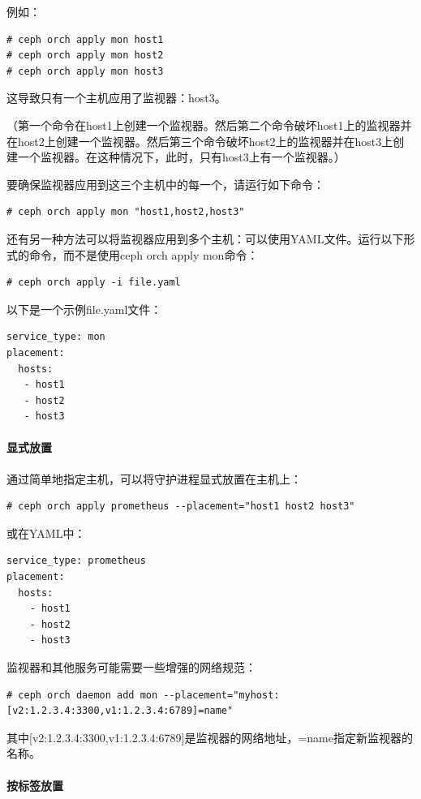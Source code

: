 \documentclass[12pt,UTF8]{ctexbook}
\begin{document}
例如：
\begin{verbatim}
# ceph orch apply mon host1
# ceph orch apply mon host2
# ceph orch apply mon host3
\end{verbatim}

这导致只有一个主机应用了监视器：host3。

（第一个命令在host1上创建一个监视器。然后第二个命令破坏host1上的监视器并在host2上创建一个监视器。然后第三个命令破坏host2上的监视器并在host3上创建一个监视器。在这种情况下，此时，只有host3上有一个监视器。）

要确保监视器应用到这三个主机中的每一个，请运行如下命令：
\begin{verbatim}
# ceph orch apply mon "host1,host2,host3"
\end{verbatim}

还有另一种方法可以将监视器应用到多个主机：可以使用YAML文件。运行以下形式的命令，而不是使用ceph orch apply mon命令：
\begin{verbatim}
# ceph orch apply -i file.yaml
\end{verbatim}

以下是一个示例file.yaml文件：
\begin{verbatim}
service_type: mon
placement:
  hosts:
   - host1
   - host2
   - host3
\end{verbatim}

\paragraph{显式放置}

通过简单地指定主机，可以将守护进程显式放置在主机上：
\begin{verbatim}
# ceph orch apply prometheus --placement="host1 host2 host3"
\end{verbatim}

或在YAML中：
\begin{verbatim}
service_type: prometheus
placement:
  hosts:
    - host1
    - host2
    - host3
\end{verbatim}

监视器和其他服务可能需要一些增强的网络规范：
\begin{verbatim}
# ceph orch daemon add mon --placement="myhost:[v2:1.2.3.4:3300,v1:1.2.3.4:6789]=name"
\end{verbatim}

其中[v2:1.2.3.4:3300,v1:1.2.3.4:6789]是监视器的网络地址，=name指定新监视器的名称。

\paragraph{按标签放置}
\end{document}
